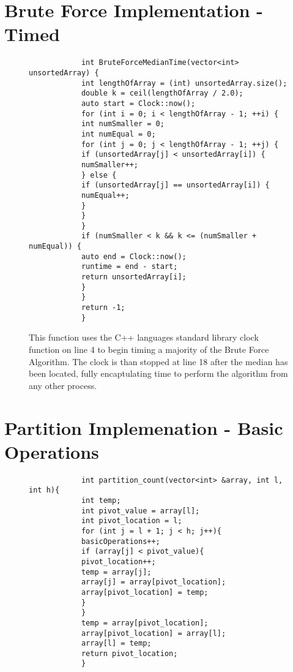 \documentclass[a4paper,12pt]{article} %
\begin{document}
\begin{appendices}
		\section{Brute Force Implementation - Timed}
		\begin{figure}[H]
			\begin{lstlisting}
			int BruteForceMedianTime(vector<int> unsortedArray) {
			int lengthOfArray = (int) unsortedArray.size();
			double k = ceil(lengthOfArray / 2.0);
			auto start = Clock::now();
			for (int i = 0; i < lengthOfArray - 1; ++i) {
			int numSmaller = 0;
			int numEqual = 0;
			for (int j = 0; j < lengthOfArray - 1; ++j) {
			if (unsortedArray[j] < unsortedArray[i]) {
			numSmaller++;
			} else {
			if (unsortedArray[j] == unsortedArray[i]) {
			numEqual++;
			}
			}
			}
			if (numSmaller < k && k <= (numSmaller + numEqual)) {
			auto end = Clock::now();
			runtime = end - start;
			return unsortedArray[i];
			}
			}
			return -1;
			}
			\end{lstlisting}
			\caption{\label{BruteForceImplementationTimed} This function uses the C++ languages standard library clock function  on line 4 to begin timing a majority of the Brute Force Algorithm. The clock is than stopped at line 18 after the median has been located, fully encaptulating time to perform the algorithm from any other process.}
		\end{figure}
		
		\newpage
		
		\section{Partition Implemenation - Basic Operations}
		\begin{figure}[H]
			\begin{lstlisting}
			int partition_count(vector<int> &array, int l, int h){
			int temp;
			int pivot_value = array[l];
			int pivot_location = l;
			for (int j = l + 1; j < h; j++){
			basicOperations++;
			if (array[j] < pivot_value){
			pivot_location++;
			temp = array[j];
			array[j] = array[pivot_location];
			array[pivot_location] = temp;
			}
			}
			temp = array[pivot_location];
			array[pivot_location] = array[l];
			array[l] = temp;
			return pivot_location;
			}
			\end{lstlisting}
			\caption{\label{PartitionImplementationOps} } 
		\end{figure}
		
		\newpage
		

\end{appendices}
\end{document}
